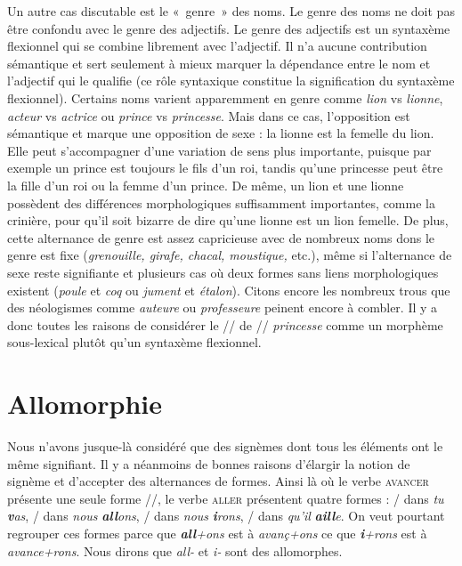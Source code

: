 {    Un autre cas discutable est le «~genre~» des noms. Le genre des noms ne doit pas être confondu avec le genre des adjectifs. Le genre des adjectifs est un syntaxème flexionnel qui se combine librement avec l’adjectif. Il n’a aucune contribution sémantique et sert seulement à mieux marquer la dépendance entre le nom et l’adjectif qui le qualifie (ce rôle syntaxique constitue la signification du syntaxème flexionnel). Certains noms varient apparemment en genre comme \textit{lion} vs \textit{lionne}, \textit{acteur} vs \textit{actrice} ou \textit{prince} vs \textit{princesse}. Mais dans ce cas, l’opposition est sémantique et marque une opposition de sexe : la lionne est la femelle du lion. Elle peut s’accompagner d’une variation de sens plus importante, puisque par exemple un prince est toujours le fils d’un roi, tandis qu’une princesse peut être la fille d’un roi ou la femme d’un prince. De même, un lion et une lionne possèdent des différences morphologiques suffisamment importantes, comme la crinière, pour qu’il soit bizarre de dire qu’une lionne est un lion femelle. De plus, cette alternance de genre est assez capricieuse avec de nombreux noms dons le genre est fixe (\textit{grenouille, girafe, chacal, moustique,} etc.), même si l’alternance de sexe reste signifiante et plusieurs cas où deux formes sans liens morphologiques existent (\textit{poule} et \textit{coq} ou \textit{jument} et \textit{étalon}). Citons encore les nombreux trous que des néologismes comme \textit{auteure} ou \textit{professeure} peinent encore à combler. Il y a donc toutes les raisons de considérer le // de // \textit{princesse} comme un morphème sous-lexical plutôt qu’un syntaxème flexionnel.
}
\section{Allomorphie}\label{sec:2.2.20}

Nous n’avons jusque-là considéré que des signèmes dont tous les éléments ont le même signifiant. Il y a néanmoins de bonnes raisons d’élargir la notion de signème et d’accepter des alternances de formes. Ainsi là où le verbe \textsc{avancer} présente une seule forme //, le verbe \textsc{aller} présentent quatre formes : / dans \textit{tu} \textbf{\textit{v}}\textit{as}, / dans \textit{nous} \textbf{\textit{all}}\textit{ons}, / dans \textit{nous} \textbf{\textit{i}}\textit{rons}, / dans \textit{qu’il} \textbf{\textit{aill}}\textit{e}. On veut pourtant regrouper ces formes parce que \textbf{\textit{all}}\textit{+ons} est à \textit{avanç+ons} ce que \textbf{\textit{i}}\textit{+rons} est à \textit{avance+rons}. Nous dirons que \textit{all-} et \textit{i-} sont des allomorphes.

